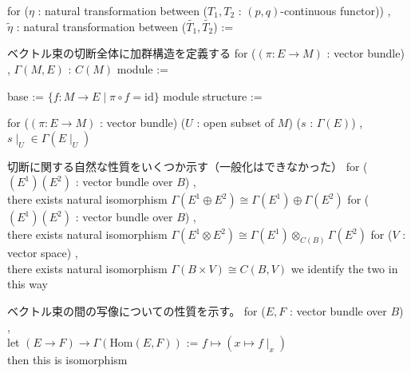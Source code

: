 \begin{Definition}
\itemdefi
  for (\(\eta\) : natural transformation between (\(T_1 , T_2\) : \((p,q)\)-continuous functor)) ,\\
  \(\tilde{\eta}\) : natural transformation between (\(\tilde{T_1} , \tilde{T_2}\)) :=
\end{Definition}

\begin{Definition}
\itemnote
  ベクトル束の切断全体に加群構造を定義する
\itemdefi
  for (\((\pi : E \to M)\) : vector bundle) , \(\Gamma(M , E)\) : \(C(M)\) module :=
  \begin{itemize}
    \itemenum base := \(\{f : M \to E \mid \pi \circ f = \text{id}\}\)
    \itemenum module structure := 
  \end{itemize}
\itemprop
  for (\((\pi : E \to M)\) : vector bundle) (\(U\) : open subset of \(M\)) (\(s\) : \(\Gamma(E)\)) , \(s \mid_{U} \in \Gamma(E \mid_{U})\)
\end{Definition}

\begin{Theorem}
\itemnote
  切断に関する自然な性質をいくつか示す（一般化はできなかった）
\itemprop
  for (\((E^1) (E^2)\) : vector bundle over \(B\)) ,\\
  there exists natural isomorphism \(\Gamma(E^1 \oplus E^2) \cong \Gamma(E^1) \oplus \Gamma(E^2)\)
\itemprop
  for (\((E^1) (E^2)\) : vector bundle over \(B\)) ,\\
  there exists natural isomorphism \(\Gamma(E^1 \otimes E^2) \cong \Gamma(E^1) \otimes_{C(B)} \Gamma(E^2)\)
\itemprop
  for (\(V\) : vector space) ,\\
  there exists natural isomorphism \(\Gamma(B \times V) \cong C(B , V)\)
\itemdefi
  we identify the two in this way
\end{Theorem}

\begin{Theorem}
\itemnote
  ベクトル束の間の写像についての性質を示す。
\itemdefi
  for (\(E , F\) : vector bundle over \(B\)) ,\\
  let \((E \to F) \to \Gamma(\text{Hom}(E , F))\) := \(f \mapsto (x \mapsto f \mid_{x})\) \\
  then this is isomorphism
\end{Theorem}

